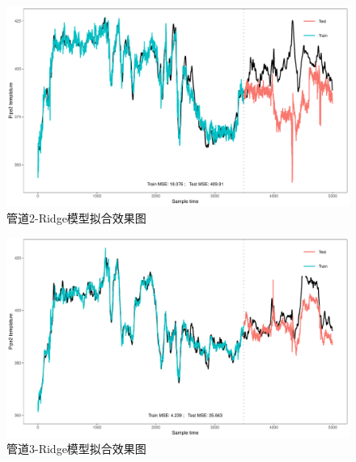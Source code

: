 \documentclass[
]{article}
\begin{document}
\begin{figure}

{\centering \includegraphics{TJRJCP_DuXingx_202105_files/figure-latex/unnamed-chunk-30-1} 

}

\caption{管道2-Ridge模型拟合效果图}\label{fig:unnamed-chunk-30}
\end{figure}

\begin{figure}

{\centering \includegraphics{TJRJCP_DuXingx_202105_files/figure-latex/unnamed-chunk-31-1} 

}

\caption{管道3-Ridge模型拟合效果图}\label{fig:unnamed-chunk-31}
\end{figure}
\end{document}

